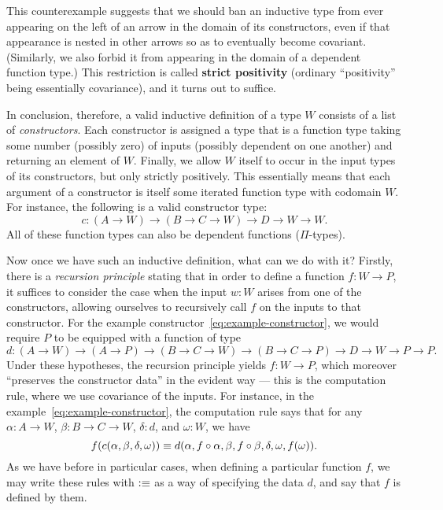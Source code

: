 This counterexample suggests that we should ban an inductive type from ever appearing on the left of an arrow in the domain of its constructors, even if that appearance is nested in other arrows so as to eventually become covariant.
(Similarly, we also forbid it from appearing in the domain of a dependent function type.)
This restriction is called \textbf{strict positivity} (ordinary ``positivity'' being essentially covariance), and it turns out to suffice.

In conclusion, therefore, a valid inductive definition of a type $W$ consists of a list of \emph{constructors}.
Each constructor is assigned a type that is a function type taking some number (possibly zero) of inputs (possibly dependent on one another) and returning an element of $W$.
Finally, we allow $W$ itself to occur in the input types of its constructors, but only strictly positively.
This essentially means that each argument of a constructor is itself some iterated function type with codomain $W$.
For instance, the following is a valid constructor type:
\begin{equation}
  c:(A\to W) \to (B\to C \to W) \to D \to W \to W.\label{eq:example-constructor}
\end{equation}
All of these function types can also be dependent functions ($\Pi$-types).

Now once we have such an inductive definition, what can we do with it?
Firstly, there is a \emph{recursion principle} stating that in order to define a function $f:W\to P$, it suffices to consider the case when the input $w:W$ arises from one of the constructors, allowing ourselves to recursively call $f$ on the inputs to that constructor.
For the example constructor~\eqref{eq:example-constructor}, we would require $P$ to be equipped with a function of type
\begin{equation}\label{eq:example-rechyp}
  d:(A\to W) \to (A\to P) \to (B\to C\to W) \to (B\to C \to P) \to D \to W \to P \to P.
\end{equation}
Under these hypotheses, the recursion principle yields $f:W\to P$, which moreover ``preserves the constructor data'' in the evident way --- this is the computation rule, where we use covariance of the inputs.
For instance, in the example~\eqref{eq:example-constructor}, the computation rule says that for any $\alpha:A\to W$, $\beta:B\to C\to W$, $\delta:d$, and $\omega:W$, we have
\begin{equation}
  f(c(\alpha,\beta,\delta,\omega)) \jdeq d(\alpha,f\circ \alpha,\beta, f\circ \beta, \delta, \omega,f(\omega)).\label{eq:example-comp}
\end{equation}
As we have before in particular cases, when defining a particular function $f$, we may write these rules with $\vcentcolon\equiv$ as a way of specifying the data $d$, and say that $f$ is defined by them.


